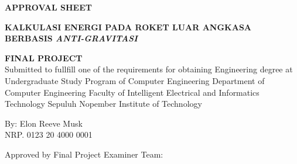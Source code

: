 \begin{center}
	\large
  \textbf{APPROVAL SHEET}
\end{center}

\thispagestyle{empty}

\begin{center}
  \textbf{KALKULASI ENERGI PADA ROKET LUAR ANGKASA BERBASIS \emph{ANTI-GRAVITASI}}
\end{center}

\begingroup
  \small
  

  \begin{center}
    \textbf{FINAL PROJECT}
    \\Submitted to fullfill one of the requirements for obtaining Engineering degree at Undergraduate Study Program of Computer Engineering Department of Computer Engineering Faculty of Intelligent Electrical and Informatics Technology Sepuluh Nopember Institute of Technology
  \end{center}


  \begin{center}
    By: Elon Reeve Musk 
    \\NRP. 0123 20 4000 0001
  \end{center}



  \begin{center}
    Approved by Final Project Examiner Team:
  \end{center}


  \begingroup
    \setlength{\tabcolsep}{0pt}


